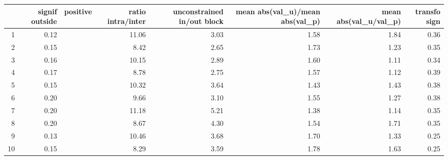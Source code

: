 \begin{table}[ht]
\centering
\begin{tabular}{rrrrrrrr}
  \hline
 & signif outside & positive & ratio intra/inter & unconstrained in/out block & mean abs(val\_u)/mean abs(val\_p) & mean abs(val\_u/val\_p) & transfo sign \\ 
  \hline
1 & 0.12 &  & 11.06 & 3.03 & 1.58 & 1.84 & 0.36 \\ 
  2 & 0.15 &  & 8.42 & 2.65 & 1.73 & 1.23 & 0.35 \\ 
  3 & 0.16 &  & 10.15 & 2.89 & 1.60 & 1.11 & 0.34 \\ 
  4 & 0.17 &  & 8.78 & 2.75 & 1.57 & 1.12 & 0.39 \\ 
  5 & 0.15 &  & 10.32 & 3.64 & 1.43 & 1.43 & 0.38 \\ 
  6 & 0.20 &  & 9.66 & 3.10 & 1.55 & 1.27 & 0.38 \\ 
  7 & 0.20 &  & 11.18 & 5.21 & 1.38 & 1.14 & 0.35 \\ 
  8 & 0.20 &  & 8.67 & 4.30 & 1.54 & 1.71 & 0.35 \\ 
  9 & 0.13 &  & 10.46 & 3.68 & 1.70 & 1.33 & 0.25 \\ 
  10 & 0.15 &  & 8.29 & 3.59 & 1.78 & 1.63 & 0.25 \\ 
   \hline
\end{tabular}
\end{table}
